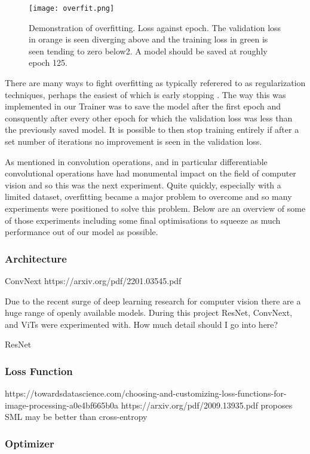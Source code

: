 \begin{figure}[h]
    \centering
    \texttt{[image: overfit.png]}
    \caption{Demonstration of overfitting.  Loss against epoch. The validation loss in orange is seen diverging above and the training loss in green is seen tending
    to zero below2.
    A model should be saved at roughly epoch 125.}
    \label{fig:overfit}
\end{figure}

There are many ways to fight overfitting as typically referered to as regularization techniques, perhaps the easiest of which is early stopping \cite{}.
The way this was implemented in our Trainer was to save the model after the first epoch and consquently after every other epoch for which the validation 
loss was less than the previously saved model.  It is possible to then stop training entirely if after a set number of iterations no improvement is seen 
in the validation loss.

As mentioned in  convolution operations, and in particular differentiable convolutional operations have had monumental 
impact on the field of computer vision and so this was the next experiment. Quite quickly, especially with a limited dataset, overfitting 
became a major problem to overcome and so many experiments were positioned to solve this problem.  Below are an overview of some of those 
experiments including some final optimisations to squeeze as much performance out of our model as possible.


\subsubsection{Architecture}
ConvNext https://arxiv.org/pdf/2201.03545.pdf

Due to the recent surge of deep learning research for computer vision there are a huge range of openly available models.
During this project ResNet, ConvNext, and ViTs were experimented with.  How much detail should I go into here?

ResNet

\subsubsection{Loss Function}
https://towardsdatascience.com/choosing-and-customizing-loss-functions-for-image-processing-a0e4bf665b0a
https://arxiv.org/pdf/2009.13935.pdf proposes SML may be better than cross-entropy

\subsubsection{Optimizer}


